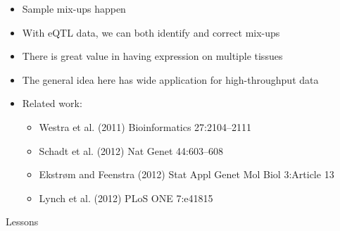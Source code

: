 \documentclass[12pt]{article}
\newcommand{\headsize}{\fontsize{35}{35} \selectfont}
\newcommand{\smallersize}{\fontsize{20}{25} \selectfont}
\newcommand{\smallestsize}{\fontsize{18}{22} \selectfont}
\begin{document}
\vspace{3cm} \color{mywhite} \smallersize

\hfill \begin{minipage}{10in}

\begin{itemize}
\itemsep24pt

\item Sample mix-ups happen



\item With eQTL data, we can both identify and {\color{mypink}
  correct} mix-ups

\item There is great value in having expression on multiple tissues

\item The general idea here has wide application for high-throughput data

\item Related work:

\smallestsize \color{myblue}
\begin{itemize}
\item Westra et al. (2011) Bioinformatics 27:2104--2111
\item Schadt et al. (2012) Nat Genet 44:603--608
\item Ekstr{\o}m and Feenstra (2012) Stat Appl Genet Mol Biol
  3:Article 13
\item Lynch et al. (2012) PLoS ONE 7:e41815
\end{itemize}

\end{itemize}
\end{minipage}



\newpage

\headsize \color{myyellow}
\hfill \begin{minipage}{5.75in}
\centering
Lessons
\end{minipage}

\vspace{20mm} \color{mywhite} \smallersize
\end{document}
